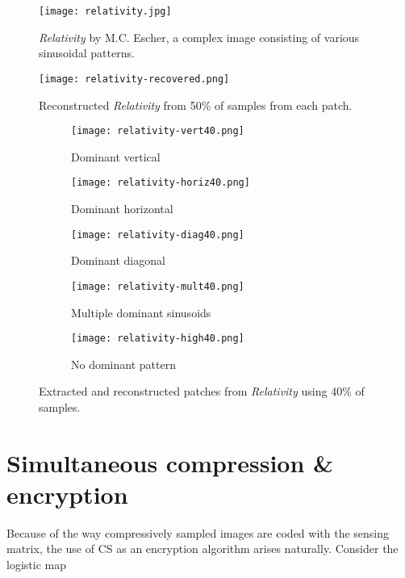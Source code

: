\begin{figure}[htb]
	\texttt{[image: relativity.jpg]}
	\caption{\textit{Relativity} by M.C. Escher, a complex image consisting of various sinusoidal patterns.}
	\label{fig:relativity}
\end{figure}

\begin{figure}[htb]
	\texttt{[image: relativity-recovered.png]}
	\caption{Reconstructed \textit{Relativity} from 50\% of samples from each patch.}
	\label{fig:relativity-recovered}
\end{figure}

\begin{figure}[htb]
	\centering
	\begin{subfigure}{\textwidth}
		\centering
		\texttt{[image: relativity-vert40.png]}
		\caption{Dominant vertical}
		\label{fig:relativity-vert40}
	\end{subfigure}
	\begin{subfigure}{\textwidth}
		\centering
		\texttt{[image: relativity-horiz40.png]}
		\caption{Dominant horizontal}
		\label{fig:relativity-horiz40}
	\end{subfigure}
	\begin{subfigure}{\textwidth}
		\centering
		\texttt{[image: relativity-diag40.png]}
		\caption{Dominant diagonal}
		\label{fig:relativity-diag40}
	\end{subfigure}
	\begin{subfigure}{\textwidth}
		\centering
		\texttt{[image: relativity-mult40.png]}
		\caption{Multiple dominant sinusoids}
		\label{fig:relativity-mult40}
	\end{subfigure}
	\begin{subfigure}{\textwidth}
		\centering
		\texttt{[image: relativity-high40.png]}
		\caption{No dominant pattern}
		\label{fig:relativity-high40}
	\end{subfigure}
	\caption{Extracted and reconstructed patches from \textit{Relativity} using 40\% of samples.}
	\label{fig:relativity-dominant-slices}
\end{figure}


\section{Simultaneous compression \& encryption}
Because of the way compressively sampled images are coded with the sensing matrix, the use of CS as an encryption algorithm arises naturally. Consider the logistic map

